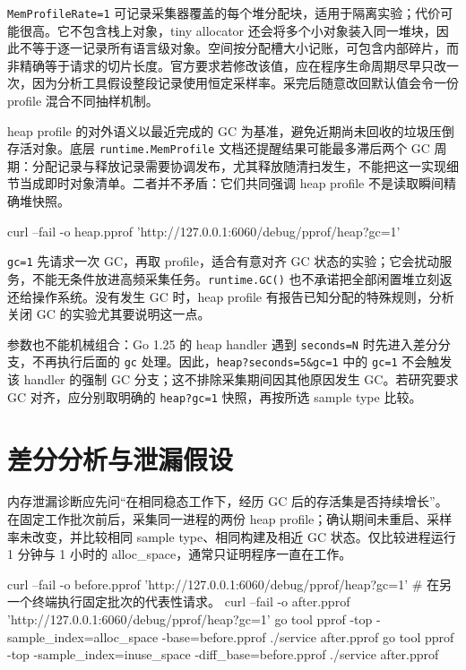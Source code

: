 \documentclass[UTF8,fontset=fandol,openany,11pt]{ctexbook}
\begin{document}
\texttt{MemProfile\allowbreak{}Rate=1} 可记录采集器覆盖的每个堆分配块，适用于隔离实验；代价可能很高。它不包含栈上对象，tiny allocator 还会将多个小对象装入同一堆块，因此不等于逐一记录所有语言级对象。空间按分配槽大小记账，可包含内部碎片，而非精确等于请求的切片长度。官方要求若修改该值，应在程序生命周期尽早只改一次，因为分析工具假设整段记录使用恒定采样率。采完后随意改回默认值会令一份 profile 混合不同抽样机制。

heap profile 的对外语义以最近完成的 GC 为基准，避免近期尚未回收的垃圾压倒存活对象。底层 \texttt{runtime.\allowbreak{}MemProfile} 文档还提醒结果可能最多滞后两个 GC 周期：分配记录与释放记录需要协调发布，尤其释放随清扫发生，不能把这一实现细节当成即时对象清单。二者并不矛盾：它们共同强调 heap profile 不是读取瞬间精确堆快照。\cite{tools-pprof}\cite{tools-mprof}

\begin{codeblock}
curl --fail -o heap.pprof   'http://127.0.0.1:6060/debug/pprof/heap?gc=1'
\end{codeblock}

\texttt{gc=1} 先请求一次 GC，再取 profile，适合有意对齐 GC 状态的实验；它会扰动服务，不能无条件放进高频采集任务。\texttt{runtime.\allowbreak{}GC()} 也不承诺把全部闲置堆立刻返还给操作系统。没有发生 GC 时，heap profile 有报告已知分配的特殊规则，分析关闭 GC 的实验尤其要说明这一点。\cite{tools-http-pprof}

参数也不能机械组合：Go 1.25 的 heap handler 遇到 \texttt{seconds=N} 时先进入差分分支，不再执行后面的 \texttt{gc} 处理。因此，\texttt{heap?seconds=5\&gc=1} 中的 \texttt{gc=1} 不会触发该 handler 的强制 GC 分支；这不排除采集期间因其他原因发生 GC。若研究要求 GC 对齐，应分别取明确的 \texttt{heap?gc=1} 快照，再按所选 sample type 比较。

\section{差分分析与泄漏假设}
内存泄漏诊断应先问“在相同稳态工作下，经历 GC 后的存活集是否持续增长”。在固定工作批次前后，采集同一进程的两份 heap profile；确认期间未重启、采样率未改变，并比较相同 sample type、相同构建及相近 GC 状态。仅比较进程运行 1 分钟与 1 小时的 alloc\_space，通常只证明程序一直在工作。

\begin{codeblock}
curl --fail -o before.pprof   'http://127.0.0.1:6060/debug/pprof/heap?gc=1'
# 在另一个终端执行固定批次的代表性请求。
curl --fail -o after.pprof   'http://127.0.0.1:6060/debug/pprof/heap?gc=1'
go tool pprof -top -sample_index=alloc_space   -base=before.pprof ./service after.pprof
go tool pprof -top -sample_index=inuse_space   -diff_base=before.pprof ./service after.pprof
\end{codeblock}
\end{document}
